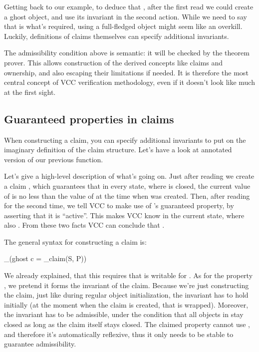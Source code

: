 Getting back to our  example, to deduce that , after
the first read we could create a ghost  object, and
use its invariant in the second action.
While we need to say that  is what's required,
using a full-fledged object might seem like an overkill.
Luckily, definitions of claims themselves can specify additional invariants.

\begin{note}
The admissibility condition above is semantic: it will be checked by the theorem
prover. 
This allows construction of the derived concepts like claims and ownership,
and also escaping their limitations if needed.
It is therefore the most central concept of VCC verification methodology,
even if it doesn't look like much at the first sight.
\end{note}

\subsection{Guaranteed properties in claims}
\label{sect:claim-props}

When constructing a claim, you can specify additional invariants to put on
the imaginary definition of the claim structure.
Let's have a look at annotated version of our previous  function.


\noindent
Let's give a high-level description of what's going on.
Just after reading  we create a claim , which guarantees
that in every state, where  is closed,
the current value of  is no less than the value of 
at the time when  was created.
Then, after reading  for the second time, we tell VCC to
make use of 's guaranteed property, by asserting that it is ``active''.
This makes VCC know  in the current state, where also
.
From these two facts VCC can conclude that .

The general syntax for constructing a claim is:

\begin{VCC}
_(ghost c = \make_claim(S, P))
\end{VCC}

\noindent
We already explained, that this requires that  is writable for .
As for the property , we pretend it forms the invariant of the claim.
Because we're just constructing the claim, just like during regular object initialization,
the invariant has to hold initially (\ie at the moment when the claim is created,
that is wrapped).
Moreover, the invariant has to be admissible, under the condition
that all objects in  stay closed as long as the claim itself
stays closed.
The claimed property cannot use , and therefore it's automatically
reflexive, thus it only needs to be stable to guarantee admissibility.

